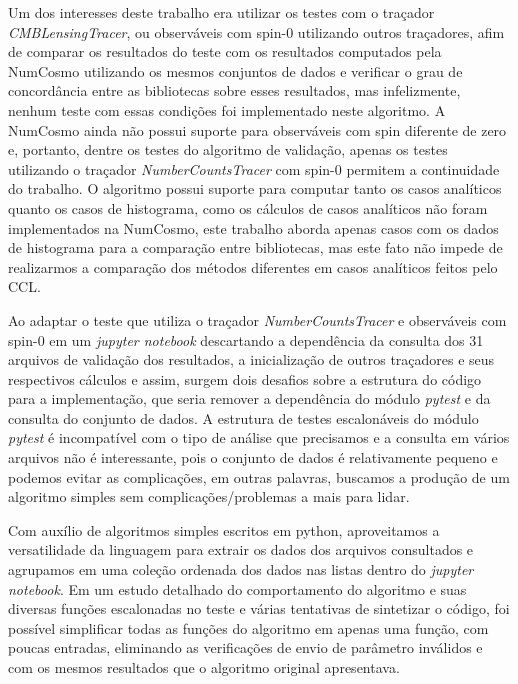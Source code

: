 Um dos interesses deste trabalho era utilizar os testes com o traçador \textit{CMBLensingTracer}, ou observáveis com spin-0 utilizando outros traçadores, afim de comparar os resultados do teste com os resultados computados pela NumCosmo utilizando os mesmos conjuntos de dados e verificar o grau de concordância entre as bibliotecas sobre esses resultados, mas infelizmente, nenhum teste com essas condições foi implementado neste algoritmo. A NumCosmo ainda não possui suporte para observáveis com spin diferente de zero e, portanto, dentre os testes do algoritmo de validação, apenas os testes utilizando o traçador  \textit{NumberCountsTracer} com spin-0 permitem a continuidade do trabalho. O algoritmo possui suporte para computar tanto os casos analíticos quanto os casos de histograma, como os cálculos de casos analíticos não foram implementados na NumCosmo, este trabalho aborda apenas casos com  os dados de histograma para a comparação entre bibliotecas, mas este fato não impede de realizarmos a comparação dos métodos diferentes em casos analíticos feitos pelo CCL.

Ao adaptar o teste que utiliza o traçador \textit{NumberCountsTracer} e observáveis com spin-0 em um \textit{jupyter notebook} descartando a dependência da consulta dos 31 arquivos de validação dos resultados, a inicialização de outros traçadores e seus respectivos cálculos e assim, surgem dois desafios sobre a estrutura do código para a implementação, que seria remover a dependência do módulo \textit{pytest} e da consulta do conjunto de dados. A estrutura de testes escalonáveis do módulo \textit{pytest} é incompatível com o tipo de análise que precisamos e a consulta em vários arquivos não é interessante, pois o conjunto de dados é relativamente pequeno e podemos evitar as complicações, em outras palavras, buscamos a produção de um algoritmo simples sem complicações/problemas a mais para lidar.

Com auxílio de algoritmos simples escritos em python, aproveitamos a versatilidade da linguagem para extrair os dados dos arquivos consultados e agrupamos em uma coleção ordenada dos dados nas listas dentro do \textit{jupyter notebook}. Em um estudo detalhado do comportamento do algoritmo e suas diversas funções escalonadas no teste e várias tentativas de sintetizar o código, foi possível simplificar todas as funções do algoritmo em apenas uma função, com poucas entradas, eliminando as verificações de envio de parâmetro inválidos e com os mesmos resultados que o algoritmo original apresentava.

